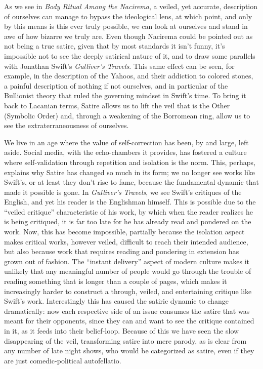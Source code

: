 \documentclass[11pt,letterpaper]{article}
\theoremstyle{definition}
\begin{document}
As we see in \textit{Body Ritual Among the Nacirema},\autocite{miner_1956} a veiled, yet accurate, description of ourselves can manage to bypass the ideological lens, at which point, and only by this means is this ever truly possible, we can look at ourselves and stand in awe of how bizarre we truly are. Even though Nacirema could be pointed out as not being a true satire, given that by most standards it isn't funny, it's impossible not to see the deeply satirical nature of it, and to draw some parallels with Jonathan Swift's \textit{Gulliver's Travels}. This same effect can be seen, for example, in the description of the Yahoos, and their addiction to colored stones,\autocite{swift_rivero_2002} a painful description of nothing if not ourselves, and in particular of the Bullionist theory that ruled the governing mindset in Swift's time. To bring it back to Lacanian terms, Satire allows us to lift the veil that is the Other (Symbolic Order) and, through a weakening of the Borromean ring, allow us to see the extraterraneousness of ourselves.

We live in an age where the value of self-correction has been, by and large, left aside. Social media, with the echo-chambers it provides, has fostered a culture where self-validation through repetition and isolation is the norm. This, perhaps, explains why Satire has changed so much in its form; we no longer see works like Swift's, or at least they don't rise to fame, because the fundamental dynamic that made it possible is gone. In \textit{Gulliver's Travels}, we see Swift's critiques of the English, and yet his reader is the Englishman himself. This is possible due to the ``veiled critique'' characteristic of his work, by which when the reader realizes he is being critiqued, it is far too late for he has already read and pondered on the work. Now, this has become impossible, partially because the isolation aspect makes critical works, however veiled, difficult to reach their intended audience, but also because work that requires reading and pondering in extension has grown out of fashion. The ``instant delivery'' aspect of modern culture makes it unlikely that any meaningful number of people would go through the trouble of reading something that is longer than a couple of pages, which makes it increasingly harder to construct a through, veiled, and entertaining critique like Swift's work. Interestingly this has caused the satiric dynamic to change dramatically: now each respective side of an issue consumes the satire that was meant for their opponents, since they can and want to see the critique contained in it, as it feeds into their belief-loop. Because of this we have seen the slow disappearing of the veil, transforming satire into mere parody, as is clear from any number of late night shows, who would be categorized as satire, even if they are just comedic-political autofellatio.
\end{document}
